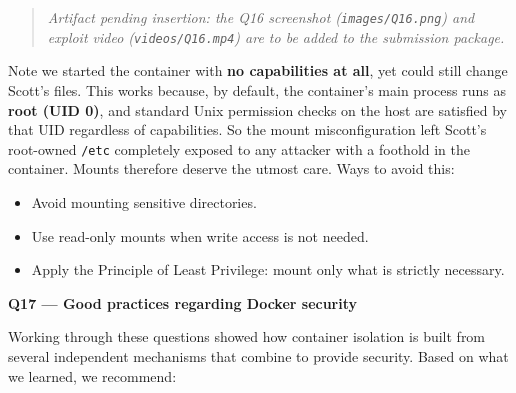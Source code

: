 \documentclass[11pt,a4paper]{article}
\newcommand{\question}[1]{\par\medskip\noindent\textbf{#1}\par\smallskip}
\begin{document}
\begin{quote}
\textit{Artifact pending insertion: the Q16 screenshot (\texttt{images/Q16.png}) and exploit video (\texttt{videos/Q16.mp4}) are to be added to the submission package.}
\end{quote}

Note we started the container with \textbf{no capabilities at all}, yet could still change Scott's files. This works because, by default, the container's main process runs as \textbf{root (UID 0)}, and standard Unix permission checks on the host are satisfied by that UID regardless of capabilities. So the mount misconfiguration left Scott's root-owned \texttt{/etc} completely exposed to any attacker with a foothold in the container. Mounts therefore deserve the utmost care. Ways to avoid this:

\begin{itemize}[nosep]
    \item Avoid mounting sensitive directories.
    \item Use read-only mounts when write access is not needed.
    \item Apply the Principle of Least Privilege: mount only what is strictly necessary.
\end{itemize}

\question{Q17 --- Good practices regarding Docker security}
Working through these questions showed how container isolation is built from several independent mechanisms that combine to provide security. Based on what we learned, we recommend:
\end{document}

